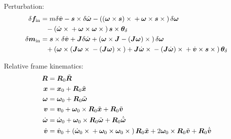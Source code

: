 \documentclass[10pt,fleqn,subeqn]{report}
\newcommand{\T}[1]{\bm{#1}}
\newcommand{\TT}[1]{\bm{#1}}
\begin{document}
Perturbation:
\begin{subequations}
\begin{align}
	\delta \T{f}_{\text{in}}
	&=
	m \delta \dot{\T{v}}
	- \T{s} \times \delta \dot{\T{\omega}}
	- \plbr{
		\plbr{\T{\omega} \times \T{s}} \times {}
		+ \T{\omega} \times \T{s} \times{}
	} \delta\T{\omega}
	\nonumber \\ &\hphantom{=}
	- \plbr{
		\dot{\T{\omega}} \times{}
		+ \T{\omega} \times \T{\omega} \times{}
	} \T{s} \times \T{\theta}_{\delta} \\
%
	\delta\T{m}_{\text{in}} &=
	\T{s} \times \delta\dot{\T{v}}
	+ \TT{J} \delta\dot{\T{\omega}}
	+ \plbr{
		\T{\omega} \times \TT{J}
		- \plbr{\TT{J} \T{\omega}} \times{}
	} \delta\T{\omega}
	\nonumber \\ &\hphantom{=}
	+ \plbr{
		\T{\omega} \times \plbr{
			\TT{J} \T{\omega} \times {}
			- \plbr{\TT{J} \T{\omega}} \times{}
		}
		+ \TT{J} \dot{\T{\omega}} \times{}
		- \plbr{\TT{J} \dot{\T{\omega}}} \times {}
		+ \dot{\T{v}} \times \T{s} \times {}
	} \T{\theta}_{\delta}
\end{align}
\end{subequations}

Relative frame kinematics:
\begin{subequations}
\begin{align}
	\TT{R} &= \TT{R}_0 \tilde{\TT{R}} \\
	\T{x} &= \T{x}_0
		+ \TT{R}_0 \tilde{\T{x}} \\
	\T{\omega} &= \T{\omega}_0
		+ \TT{R}_0 \tilde{\T{\omega}} \\
	\T{v} &= \T{v}_0
		+ \T{\omega}_0 \times \TT{R}_0 \tilde{\T{x}}
		+ \TT{R}_0 \tilde{\T{v}} \\
	\dot{\T{\omega}} &= \dot{\T{\omega}}_0
		+ \T{\omega}_0 \times \TT{R}_0 \tilde{\T{\omega}} 
		+ \TT{R}_0 \dot{\tilde{\T{\omega}}} \\
	\dot{\T{v}} &= \dot{\T{v}}_0
		+ \plbr{
			\dot{\T{\omega}}_0 \times{}
			+ \T{\omega}_0 \times \T{\omega}_0 \times{}
		} \TT{R}_0 \tilde{\T{x}}
		+ 2 \T{\omega}_0 \times \TT{R}_0 \tilde{\T{v}}
		+ \TT{R}_0 \dot{\tilde{\T{v}}}
\end{align}
\end{subequations}
\end{document}

